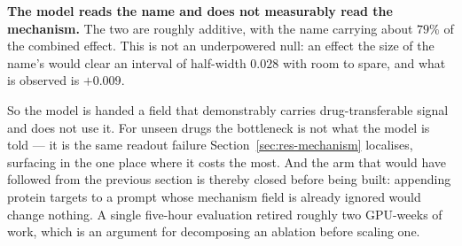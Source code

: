 \textbf{The model reads the name and does not measurably read the mechanism.} The two are roughly
additive, with the name carrying about $79\%$ of the combined effect. This is not an underpowered
null: an effect the size of the name's would clear an interval of half-width $0.028$ with room to
spare, and what is observed is $+0.009$.

So the model is handed a field that demonstrably carries drug-transferable signal and does not use
it. For unseen drugs the bottleneck is not what the model is told --- it is the same readout failure
Section~\ref{sec:res-mechanism} localises, surfacing in the one place where it costs the most. And
the arm that would have followed from the previous section is thereby closed before being built:
appending protein targets to a prompt whose mechanism field is already ignored would change nothing.
A single five-hour evaluation retired roughly two GPU-weeks of work, which is an argument for
decomposing an ablation before scaling one.
